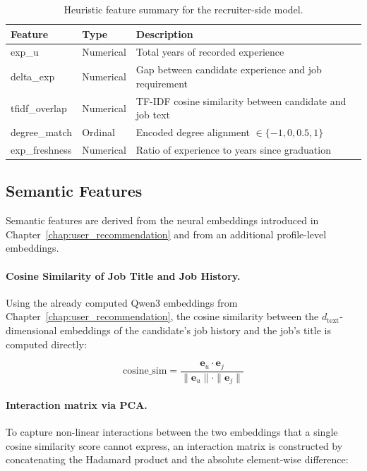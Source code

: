 \begin{table}[htbp]
    \centering
    \caption{Heuristic feature summary for the recruiter-side model.}
    \label{tab:recruiter_heuristic_features}
    \begin{tabular}{llp{6cm}}
        \toprule
        \textbf{Feature} & \textbf{Type} & \textbf{Description} \\
        \midrule
        exp\_u         & Numerical & Total years of recorded experience \\
        delta\_exp     & Numerical & Gap between candidate experience and job requirement \\
        tfidf\_overlap & Numerical & TF-IDF cosine similarity between candidate and job text \\
        degree\_match  & Ordinal   & Encoded degree alignment $\in \{-1, 0, 0.5, 1\}$ \\
        exp\_freshness & Numerical & Ratio of experience to years since graduation \\
        \bottomrule
    \end{tabular}
\end{table}


\subsection{Semantic Features}
\label{sec:recruiter_semantic}

Semantic features are derived from the neural embeddings introduced in Chapter~\ref{chap:user_recommendation} and from an additional profile-level embeddings.

\paragraph{Cosine Similarity of Job Title and Job History.} Using the already computed Qwen3 embeddings from Chapter~\ref{chap:user_recommendation}, the cosine similarity between the $d_{\text{text}}$-dimensional embeddings of the candidate's job history and the job's title is computed directly:

\begin{equation}
    \text{cosine\_sim} = \frac{\mathbf{e}_u \cdot \mathbf{e}_j}{\|\mathbf{e}_u\| \cdot \|\mathbf{e}_j\|}
\end{equation}

\paragraph{Interaction matrix via PCA.} To capture non-linear interactions 
between the two embeddings that a single cosine similarity score cannot 
express, an interaction matrix is constructed by concatenating the Hadamard 
product and the absolute element-wise difference:

